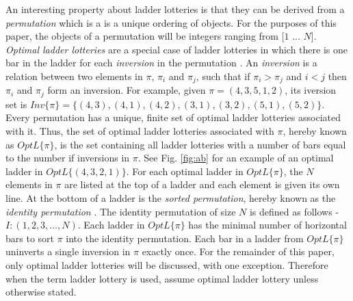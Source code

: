 An interesting property about ladder lotteries is that they can be derived from a 
\emph{permutation} which is a is a unique ordering of objects. \cite{A1}
For the purposes of this paper, the objects of a permutation will be integers 
ranging from [$1$ $\dots$ $N$]. \emph{Optimal ladder lotteries} are a special case of ladder 
lotteries in which there is one bar in the ladder for each \emph{inversion} in the permutation \cite{A1}.
An \emph{inversion} is a relation between two elements in $\pi$, 
$\pi_{i}$ and $\pi_{j}$, such that if $\pi_{i}>\pi_{j}$ and $i<j$ then $\pi_{i}$ and $\pi_{j}$ 
form an inversion. 
For example, given $\pi=(4,3,5,1,2)$, its iversion set is $Inv\{\pi\} =\{(4,3),(4,1),(4,2),(3,1),(3,2),(5,1),(5,2)\}$.
Every permutation has a unique, finite set of optimal ladder lotteries associated with it. 
 Thus, the set of optimal ladder lotteries associated with $\pi$, 
 hereby known as \emph{$OptL\{\pi\}$}, is the set containing all ladder lotteries 
 with a number of bars equal to the number if inversions in $\pi$. 
 See Fig. \ref{fig:ab} for an example of an optimal ladder in $OptL\{(4,3,2,1)\}$.
 For each optimal ladder in $OptL\{\pi\}$, the $N$ 
 elements in $\pi$ are listed at the top of a ladder and each 
 element is given its own line. 
 At the bottom of a ladder is the \emph{sorted permutation}, 
 hereby known as the \emph{identity permutation} \cite{A1}. 
 The  identity permutation of size $N$ is defined as follows - $I:(1, 2, 3, \dots, N)$. 
 Each ladder in $OptL\{\pi\}$ has the minimal number of horizontal bars to sort $\pi$ 
 into the identity permutation. Each bar in a ladder from $OptL\{\pi\}$ uninverts a single 
 inversion in $\pi$ exactly once. For the remainder of this paper, only optimal ladder 
 lotteries will be discussed, with one exception. Therefore when the term ladder lottery is used, assume 
 optimal ladder lottery unless otherwise stated.\par
 
